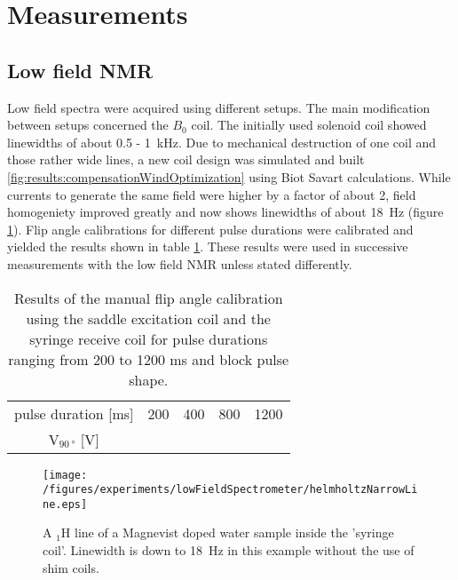 \section{Measurements}
    \subsection{Low field NMR}
    \label{chap:results:lowFieldNMR}
        Low field spectra were acquired using different setups. The main modification between setups concerned the $B_0$ coil. The initially used solenoid coil showed linewidths of about 0.5 - \SI{1}{\kilo\hertz}. Due to mechanical destruction of one coil and those rather wide lines, a new coil design was simulated and built \ref{fig:results:compensationWindOptimization} using Biot Savart calculations. While currents to generate the same field were higher by a factor of about 2, field homogeniety improved greatly and now shows linewidths of about \SI{18}{\hertz} (figure \ref{results:lowFieldSpectrometer:thinLine}). Flip angle calibrations for different pulse durations were calibrated and yielded the results shown in table \ref{table:results:FA}. These results were used in successive measurements with the low field NMR unless stated differently.
        \begin{table}
            \centering
            \begin{tabular}{ccccc}
                pulse duration [ms] & 200 &  400 & 800 & 1200 \\
                $\mathrm{V}_{\SI{90}{\degree}}$ [V] & & & & 
            \end{tabular} 
            \label{table:results:FA}
            \caption{Results of the manual flip angle calibration using the saddle excitation coil and the syringe receive coil for pulse durations ranging from 200 to 1200 ms and block pulse shape.}
        \end{table}
            \begin{figure}
                \centering
                \texttt{[image: /figures/experiments/lowFieldSpectrometer/helmholtzNarrowLine.eps]}
                \caption{A $_1\mathrm{H}$ line of a Magnevist doped water sample inside the 'syringe coil'. Linewidth is down to \SI{18}{\hertz} in this example without the use of shim coils.}
                \label{results:lowFieldSpectrometer:thinLine}
            \end{figure}

